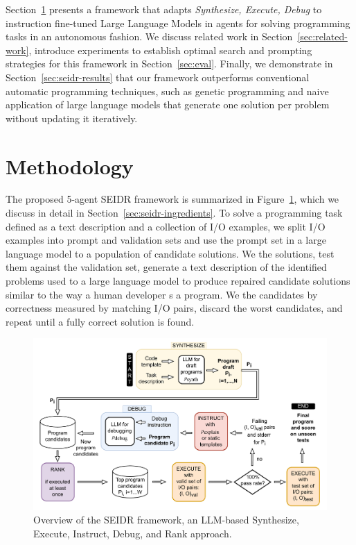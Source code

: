 Section~\ref{sec:seidr-methodology} presents a framework that adapts \emph{Synthesize, Execute, Debug} to instruction fine-tuned Large Language Models in agents for solving programming tasks in an autonomous fashion. 
We discuss related work in Section~\ref{sec:related-work}, introduce experiments to establish optimal search and prompting strategies for this framework in Section~\ref{sec:eval}. 
Finally, we demonstrate in Section~\ref{sec:seidr-results} that our framework outperforms conventional automatic programming techniques, such as genetic programming and naive application of large language models that generate one solution per problem without updating it iteratively. 

\newpage
\section{Methodology}
\label{sec:seidr-methodology}
The proposed 5-agent SEIDR framework  is summarized in Figure~\ref{fig:method}, which we discuss in detail in Section~\ref{sec:seidr-ingredients}.
To solve a programming task defined as a text description and a collection of I/O examples, we split I/O examples into prompt and validation sets and use the prompt set in a large language model to \synthesize{} a population of candidate solutions.
We \execute{} the solutions, test them against the validation set, generate a text description of the identified problems used to \instruct{} a large language model to produce repaired candidate solutions similar to the way a human developer \debug{}s a program.
We \rank{} the candidates
by correctness measured by matching I/O pairs, discard the worst candidates, and repeat until a fully correct solution is found.

\begin{figure}[H]
    \centering
    \includegraphics[width=\linewidth,trim={0mm 0mm 0mm 0mm}]{images/codex-for-psb-seidr-methodology-5.drawio.pdf}
    \caption{Overview of the SEIDR framework, an LLM-based Synthesize, Execute, Instruct, Debug, and Rank approach.}
    \label{fig:method}
\end{figure}
 

